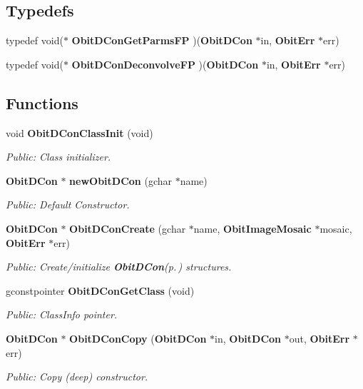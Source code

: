 \subsection*{Typedefs}
\begin{CompactItemize}
\item 
typedef void($\ast$ {\bf Obit\-DCon\-Get\-Parms\-FP} )({\bf Obit\-DCon} $\ast$in, {\bf Obit\-Err} $\ast$err)
\item 
typedef void($\ast$ {\bf Obit\-DCon\-Deconvolve\-FP} )({\bf Obit\-DCon} $\ast$in, {\bf Obit\-Err} $\ast$err)
\end{CompactItemize}
\subsection*{Functions}
\begin{CompactItemize}
\item 
void {\bf Obit\-DCon\-Class\-Init} (void)
\begin{CompactList}\small\item\em Public: Class initializer. \item\end{CompactList}\item 
{\bf Obit\-DCon} $\ast$ {\bf new\-Obit\-DCon} (gchar $\ast$name)
\begin{CompactList}\small\item\em Public: Default Constructor. \item\end{CompactList}\item 
{\bf Obit\-DCon} $\ast$ {\bf Obit\-DCon\-Create} (gchar $\ast$name, {\bf Obit\-Image\-Mosaic} $\ast$mosaic, {\bf Obit\-Err} $\ast$err)
\begin{CompactList}\small\item\em Public: Create/initialize {\bf Obit\-DCon}{\rm (p.\,\pageref{structObitDCon})} structures. \item\end{CompactList}\item 
gconstpointer {\bf Obit\-DCon\-Get\-Class} (void)
\begin{CompactList}\small\item\em Public: Class\-Info pointer. \item\end{CompactList}\item 
{\bf Obit\-DCon} $\ast$ {\bf Obit\-DCon\-Copy} ({\bf Obit\-DCon} $\ast$in, {\bf Obit\-DCon} $\ast$out, {\bf Obit\-Err} $\ast$err)
\begin{CompactList}\small\item\em Public: Copy (deep) constructor. \item\end{CompactList}\item 

\end{CompactItemize}
